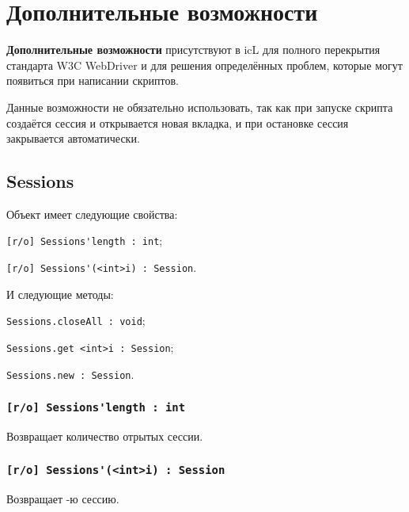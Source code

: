 \section{Дополнительные возможности}

{\bf Дополнительные возможности} присутствуют в icL для полного перекрытия стандарта W3C WebDriver и для решения определённых проблем, которые могут появиться при написании скриптов.

Данные возможности не обязательно использовать, так как при запуске скрипта создаётся сессия и открывается новая вкладка, и при остановке сессия закрывается автоматически.


\subsection{{\color{orange} Sessions}}

Объект \sessions{} имеет следующие свойства:
\begin{icItems}
	\item \lstinline|[r/o] Sessions'length : int|;
	\item \lstinline|[r/o] Sessions'(<int>i) : Session|.
\end{icItems}

И следующие методы:
\begin{icItems}
	\item \lstinline|Sessions.closeAll : void|;
	\item \lstinline|Sessions.get <int>i : Session|;
	\item \lstinline|Sessions.new : Session|.
\end{icItems}

\subsubsection{\lstinline|[r/o] Sessions'length : int|}

Возвращает количество отрытых сессии.

\subsubsection{\lstinline|[r/o] Sessions'(<int>i) : Session|}

Возвращает -ю сессию.

